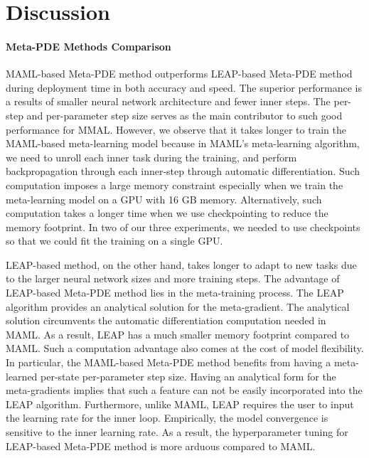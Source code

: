 \section{Discussion}
\paragraph{Meta-PDE Methods Comparison} MAML-based Meta-PDE method outperforms LEAP-based Meta-PDE method during deployment time in both accuracy and speed. The superior performance is a results of smaller neural network architecture and fewer inner steps. The per-step and per-parameter step size serves as the main contributor to such good performance for MMAL. However, we observe that it takes longer to train the MAML-based meta-learning model because in MAML's meta-learning algorithm, we need to unroll each inner task during the training, and perform backpropagation through each inner-step through automatic differentiation. Such computation imposes a large memory constraint especially when we train the meta-learning model on a GPU with 16 GB memory. Alternatively, such computation takes a longer time when we use checkpointing to reduce the memory footprint. In two of our three experiments, we needed to use checkpoints so that we could fit the training on a single GPU. 

LEAP-based method, on the other hand, takes longer to adapt to new tasks due to the larger neural network sizes and more training steps. The advantage of LEAP-based Meta-PDE method lies in the meta-training process. The LEAP algorithm provides an analytical solution for the meta-gradient. The analytical solution circumvents the automatic differentiation computation needed in MAML. As a result, LEAP has a much smaller memory footprint compared to MAML. Such a computation advantage also comes at the cost of model flexibility. In particular, the MAML-based Meta-PDE method benefits from having a meta-learned per-state per-parameter step size. Having an analytical form for the meta-gradients implies that such a feature can not be easily incorporated into the LEAP algorithm. Furthermore, unlike MAML, LEAP requires the user to input the learning rate for the inner loop. Empirically, the model convergence is sensitive to the inner learning rate. As a result, the hyperparameter tuning for LEAP-based Meta-PDE method is more arduous compared to MAML. 

